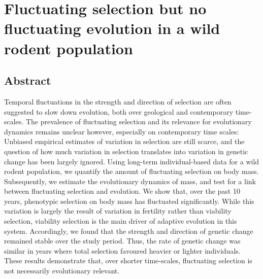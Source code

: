 

\chapter[\texorpdfstring{Chapter 5 \\ Fluctuating selection but no fluctuating evolution in a wild rodent population}{Chapter 5 -- Fluctuating selection but no fluctuating evolution in a wild rodent population}]{Fluctuating selection but no fluctuating evolution in a wild rodent population}
\label{chap:flusel}

\section{Abstract}
Temporal fluctuations in the strength and direction of selection are often suggested to slow down evolution, both over geological and contemporary time-scales. The prevalence of fluctuating selection and its relevance for evolutionary dynamics remains unclear however, especially on contemporary time scales: Unbiased empirical estimates of variation in selection are still scarce, and the question of how much variation in selection translates into variation in genetic change has been largely ignored.
Using long-term individual-based data for a wild rodent population, we quantify the amount of fluctuating selection on body mass. Subsequently, we estimate the evolutionary dynamics of mass, and test for a link between fluctuating selection and evolution. 
We show that, over the past 10 years, phenotypic selection on body mass has fluctuated significantly. While this variation is largely the result of variation in fertility rather than viability selection, viability selection is the main driver of adaptive evolution in this system. Accordingly, we found that the strength and direction of genetic change remained stable over the study period. Thus, the rate of genetic change was similar in years where total selection favoured heavier or lighter individuals.
These results demonstrate that, over shorter time-scales, fluctuating selection is not necessarily evolutionary relevant. 


